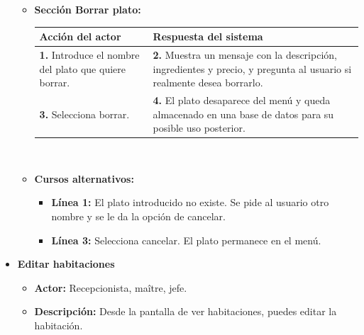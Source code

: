 \documentclass[spanish,a4paper,12pt]{report}		%
\begin{document}
\begin{itemize}
\begin{itemize}
			\item \textbf{Sección Borrar plato:} 	\\
				\begin{tabular}{|p{6cm}||p{6cm}|}
				\hline
				\textbf{Acción del actor} & \textbf{Respuesta del sistema} \\ \hline \hline
				\textbf{1.} Introduce el nombre del plato que quiere borrar. & \textbf{2.} Muestra un mensaje con la descripción, ingredientes y precio, y pregunta al usuario si realmente desea borrarlo.\\ \hline 
				\textbf{3.} Selecciona borrar. & \textbf{4.} El plato desaparece del menú y queda almacenado en una base de datos para su posible uso posterior. \\ \hline
			\end{tabular}
			\\
			\item \textbf{Cursos alternativos:} 
			\begin{itemize}
			\item  \textbf{Línea 1:} El plato introducido no existe. Se pide al usuario otro nombre y se le da la opción de cancelar.
			\item  \textbf{Línea 3:} Selecciona cancelar. El plato permanece en el menú.
			\end {itemize}
		\end {itemize}



	\item \textbf{Editar habitaciones}
		\begin{itemize}
			\item \textbf{Actor:} Recepcionista, maître, jefe.
			\item \textbf{Descripción:} Desde la pantalla de ver habitaciones, puedes editar la habitación.	
		\end {itemize}



	\end{itemize}
\end{document}
